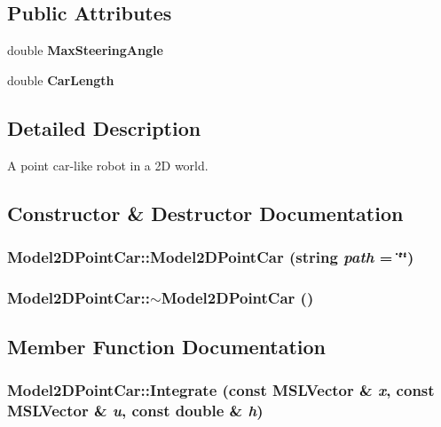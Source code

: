 \subsection*{Public Attributes}
\begin{CompactItemize}
\item 
double {\bf Max\-Steering\-Angle}
\item 
double {\bf Car\-Length}
\end{CompactItemize}


\subsection{Detailed Description}
A point car-like robot in a 2D world.



\subsection{Constructor \& Destructor Documentation}
\subsubsection{\setlength{\rightskip}{0pt plus 5cm}Model2DPoint\-Car::Model2DPoint\-Car (string {\em path} = \char`\"{}\char`\"{})}\label{classModel2DPointCar_a0}


\subsubsection{\setlength{\rightskip}{0pt plus 5cm}Model2DPoint\-Car::$\sim$Model2DPoint\-Car ()\hspace{0.3cm}{\tt  [inline, virtual]}}\label{classModel2DPointCar_a1}




\subsection{Member Function Documentation}
\subsubsection{ Model2DPoint\-Car::Integrate (const {\bf MSLVector} \& {\em x}, const {\bf MSLVector} \& {\em u}, const double \& {\em h})\hspace{0.3cm}{\tt  [virtual]}}\label{classModel2DPointCar_a2}


